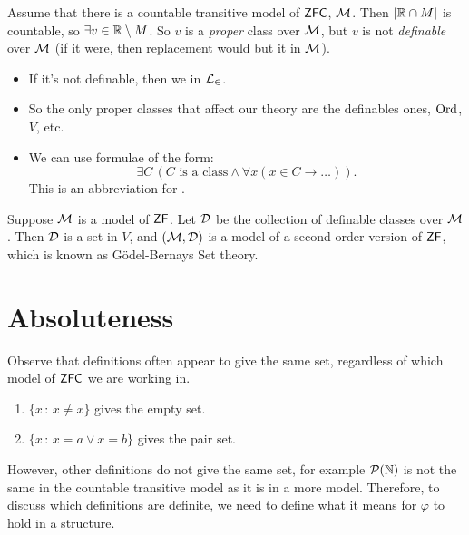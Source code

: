 \documentclass{article}
\begin{document}
\newlec

Assume that there is a countable transitive model of $\mathsf{ZFC}$, $\mathcal{M}$. Then $|\mathbb{R} \cap M|$ is countable, so $\exists v \in \mathbb{R} \setminus M$. So $v$ is a \textit{proper} class over $\mathcal{M}$, but $v$ is not \textit{definable} over $\mathcal{M}$ (if it were, then replacement would but it in $\mathcal{M}$).\gap
\begin{remark*}
    \begin{itemize}
        \item If it's not definable, then we  in $\mathcal{L}_{\in}$.
        \item So the only proper classes that affect our theory are the definables ones, $\operatorname{Ord}$, $V$, etc.
        \item We can use formulae of the form: \[ \exists C\, (C \text{ is a class} \wedge \forall x ( x \in C \rightarrow \dots)).\] This is an abbreviation for .
    \end{itemize}
\end{remark*}
Suppose $\mathcal{M}$ is a model of $\mathsf{ZF}$. Let $\mathcal{D}$ be the collection of definable classes over $\mathcal{M}$. Then $\mathcal{D}$ is a set in $V$, and $(\mathcal{M}, \mathcal{D})$ is a model of a second-order version of $\mathsf{ZF}$, which is known as G\"odel-Bernays Set theory.
\section{Absoluteness}
Observe that definitions often appear to give the same set, regardless of which model of $\mathsf{ZFC}$ we are working in. \begin{exs*}
    \begin{enumerate}
        \item $\{x \, : \, x \neq x\}$ gives the empty set.
        \item $\{ x \, : \, x = a \vee x = b\}$ gives the pair set.
    \end{enumerate}
\end{exs*}
However, other definitions do not give the same set, for example $\mathcal{P}(\mathbb{N})$ is not the same in the countable transitive model as it is in a more  model.\gap
Therefore, to discuss which definitions are definite, we need to define what it means for $\varphi$ to hold in a structure.
\end{document}
